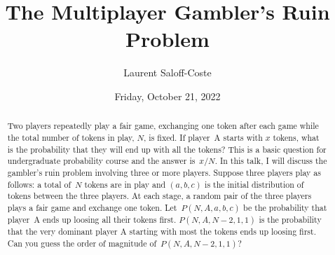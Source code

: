 \documentclass[colloquium]{UAmathtalk}
\author{Laurent Saloff-Coste}
\title{The Multiplayer Gambler’s Ruin Problem}
\date{Friday, October 21, 2022}
\begin{document}
\maketitle

\begin{abstract}
Two players repeatedly play a fair game, exchanging one token after each game while the total number of tokens in play, $N$, is fixed. If player~A starts with $x$ tokens, what is the probability that they will end up with all the tokens?  This is a basic question for undergraduate probability course and the answer is~$x/N$. In this talk, I will discuss the gambler’s ruin problem involving three or more players.  Suppose three players play as follows: a total of~$N$ tokens are in play and $(a,b,c)$ is the initial distribution of tokens between the three players. At each stage, a random pair of the three players plays a fair game and exchange one token. Let~$P(N,A,a,b,c)$ be the probability that player~A ends up loosing all their tokens first. $P(N,A,N-2,1,1)$ is the probability that the very dominant player A starting with most the tokens ends up loosing first. Can you guess the order of magnitude of~$P(N,A,N-2,1,1)$?
\end{abstract}
\end{document}
